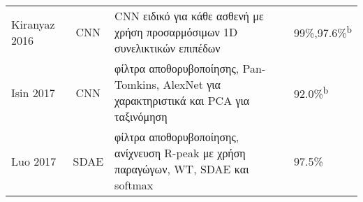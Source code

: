 \begin{sidewaystable}
\begin{tabular}{l c l l}
		Kiranyaz 2016~\cite{kiranyaz2016real}           & CNN             & CNN ειδικό για κάθε ασθενή με χρήση προσαρμόσιμων 1D συνελικτικών επιπέδων                            & 99\%,97.6\%\textsuperscript{b}                                                                                                                                                                                                                                                                                                                                                                                                                                                                                                                                                                                                                                                                                                                                                                                                                                              \\
		Isin 2017~\cite{isin2017cardiac}                & CNN             & φίλτρα αποθορυβοποίησης, Pan-Tomkins, AlexNet για χαρακτηριστικά και PCA για ταξινόμηση      & 92.0\%\textsuperscript{b}                                                                                                                                                                                                                                                                                                                                                                                                                                                                                                                                                                                                                                                                                                                                                                                                                                                   \\
		Luo 2017~\cite{luo2017patient}                  & SDAE            & φίλτρα αποθορυβοποίησης, ανίχνευση R-peak με χρήση παραγώγων, WT, SDAE και softmax                    & 97.5\%                                                                                                                                                                                                                                                                                                                                                                                                                                                                                                                                                                                                                                                                                                                                                                                                                                                                           \\

\end{tabular}
\end{sidewaystable}
